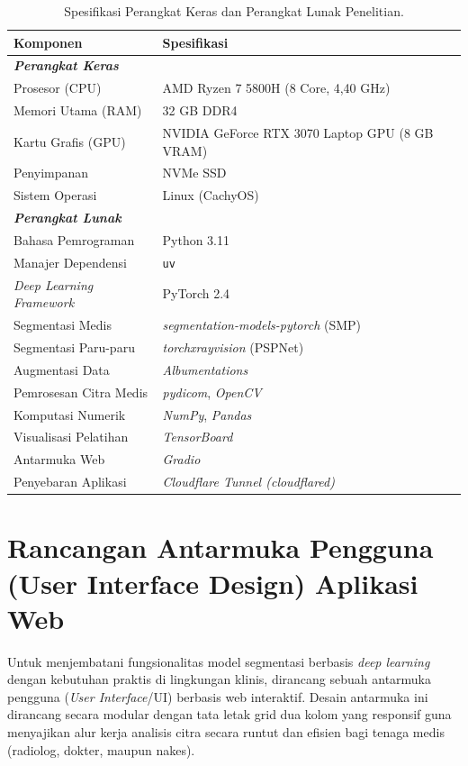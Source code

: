 \documentclass[12pt,a4paper,oneside]{book}
\begin{document}
\begin{table}[H]
  \centering
  \caption{Spesifikasi Perangkat Keras dan Perangkat Lunak Penelitian.}
  \label{tab:hardware_spec}
  \begin{tabular}{l l}
    \toprule
    \textbf{Komponen} & \textbf{Spesifikasi} \\
    \midrule
    \multicolumn{2}{l}{\textit{\textbf{Perangkat Keras}}} \\
    \midrule
    Prosesor (CPU)    & AMD Ryzen 7 5800H (8 Core, 4,40 GHz) \\
    Memori Utama (RAM) & 32 GB DDR4 \\
    Kartu Grafis (GPU) & NVIDIA GeForce RTX 3070 Laptop GPU (8 GB VRAM) \\
    Penyimpanan       & NVMe SSD \\
    Sistem Operasi    & Linux (CachyOS) \\
    \midrule
    \multicolumn{2}{l}{\textit{\textbf{Perangkat Lunak}}} \\
    \midrule
    Bahasa Pemrograman       & Python 3.11 \\
    Manajer Dependensi       & \texttt{uv} \\
    \textit{Deep Learning Framework} & PyTorch 2.4 \\
    Segmentasi Medis         & \textit{segmentation-models-pytorch} (SMP) \\
    Segmentasi Paru-paru     & \textit{torchxrayvision} (PSPNet) \\
    Augmentasi Data          & \textit{Albumentations} \\
    Pemrosesan Citra Medis   & \textit{pydicom}, \textit{OpenCV} \\
    Komputasi Numerik        & \textit{NumPy}, \textit{Pandas} \\
    Visualisasi Pelatihan    & \textit{TensorBoard} \\
    Antarmuka Web            & \textit{Gradio} \\
    Penyebaran Aplikasi      & \textit{Cloudflare Tunnel (cloudflared)} \\
    \bottomrule
  \end{tabular}
\end{table}

\section{Rancangan Antarmuka Pengguna (User Interface Design) Aplikasi Web}

Untuk menjembatani fungsionalitas model segmentasi berbasis \textit{deep learning} dengan kebutuhan praktis di lingkungan klinis, dirancang sebuah antarmuka pengguna (\textit{User Interface}/UI) berbasis web interaktif. Desain antarmuka ini dirancang secara modular dengan tata letak grid dua kolom yang responsif guna menyajikan alur kerja analisis citra secara runtut dan efisien bagi tenaga medis (radiolog, dokter, maupun nakes).
\end{document}
